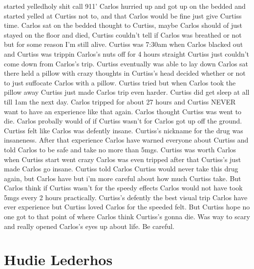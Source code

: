 \documentclass[12pt]{book}
\begin{document}
started yelledholy shit call 911' Carlos hurried up and got up on the bedded and started yelled at Curtiss not to, and that Carlos would be fine just give Curtiss time. Carlos sat on the bedded thought to Curtiss, maybe Carlos should of just stayed on the floor and died, Curtiss couldn't tell if Carlos was breathed or not but for some reason I'm still alive. Curtiss was 7:30am when Carlos blacked out and Curtiss was trippin Carlos's nuts off for 4 hours straight Curtiss just couldn't come down from Carlos's trip. Curtiss eventually was able to lay down Carlos sat there held a pillow with crazy thoughts in Curtiss's head decided whether or not to just suffocate Carlos with a pillow. Curtiss tried but when Carlos took the pillow away Curtiss just made Carlos trip even harder. Curtiss did get sleep at all till 1am the next day. Carlos tripped for about 27 hours and Curtiss NEVER want to have an experience like that again. Carlos thought Curtiss was went to die. Carlos probally would of if Curtiss wasn't for Carlos got up off the ground. Curtiss felt like Carlos was defently insane. Curtiss's nickname for the drug was insaneness. After that experience Carlos have warned everyone about Curtiss and told Carlos to be safe and take no more than 5mgs. Curtiss was worth Carlos when Curtiss start went crazy Carlos was even tripped after that Curtiss's just made Carlos go insane. Curtiss told Carlos Curtiss would never take this drug again, but Carlos have but i'm more careful about how much Curtiss take. But Carlos think if Curtiss wasn't for the speedy effects Carlos would not have took 5mgs every 2 hours practically. Curtiss's defently the best visual trip Carlos have ever experience but Curtiss loved Carlos for the speeded felt. But Curtiss hope no one got to that point of where Carlos think Curtiss's gonna die. Was way to scary and really opened Carlos's eyes up about life. Be careful.



\chapter{Hudie Lederhos}
\end{document}
